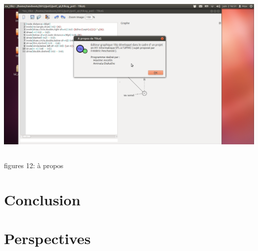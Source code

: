 \documentclass[a4paper]{report}
\begin{document}
  \includegraphics[width=15cm, height=9cm]{img/r7.png}
\\ 
figures 12: à propos
\chapter{Conclusion}
\chapter{Perspectives}
   
\end{document}
